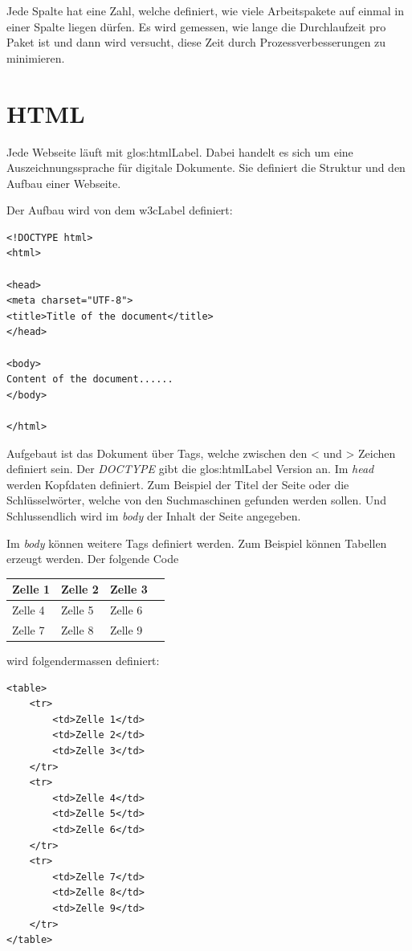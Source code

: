 Jede Spalte hat eine Zahl, welche definiert, wie viele Arbeitspakete auf einmal in einer Spalte liegen dürfen. Es wird gemessen, wie lange die Durchlaufzeit pro Paket ist und dann wird versucht, diese Zeit durch Prozessverbesserungen zu minimieren. 


\section{HTML}
Jede Webseite läuft mit \Gls{glos:htmlLabel}. Dabei handelt es sich um eine Auszeichnungssprache für digitale Dokumente. Sie definiert die Struktur und den Aufbau einer Webseite.

Der Aufbau wird von dem \gls{w3cLabel} definiert:
\begin{lstlisting}
<!DOCTYPE html>
<html>

<head>
<meta charset="UTF-8">
<title>Title of the document</title>
</head>

<body>
Content of the document......
</body>

</html> 
\end{lstlisting}

Aufgebaut ist das Dokument über Tags, welche zwischen den < und > Zeichen definiert sein. Der \textit{DOCTYPE} gibt die \Gls{glos:htmlLabel} Version an. Im \textit{head} werden Kopfdaten definiert. Zum Beispiel der Titel der Seite oder die Schlüsselwörter, welche von den Suchmaschinen gefunden werden sollen. Und Schlussendlich wird im \textit{body} der Inhalt der Seite angegeben.

Im \textit{body} können weitere Tags definiert werden. Zum Beispiel können Tabellen erzeugt werden. Der folgende Code

\begin{center}
    \begin{tabular}{| l | l | l | l |}
    \hline
	Zelle 1 & Zelle 2 & Zelle 3 \\ \hline
	Zelle 4 & Zelle 5 & Zelle 6 \\ \hline
	Zelle 7 & Zelle 8 & Zelle 9 \\ \hline
    \end{tabular}
\end{center}

wird folgendermassen definiert:

\begin{lstlisting}
<table>
	<tr>
		<td>Zelle 1</td>
		<td>Zelle 2</td>
		<td>Zelle 3</td>
	</tr>
	<tr>
		<td>Zelle 4</td>
		<td>Zelle 5</td>
		<td>Zelle 6</td>
	</tr>
	<tr>
		<td>Zelle 7</td>
		<td>Zelle 8</td>
		<td>Zelle 9</td>
	</tr>
</table>
\end{lstlisting}


